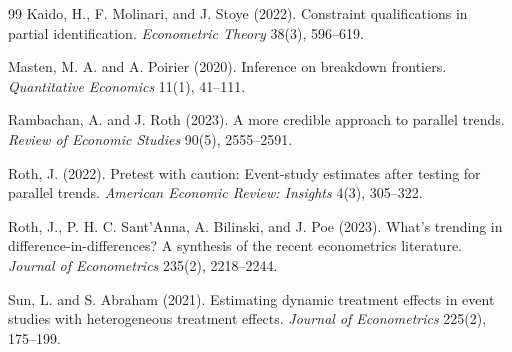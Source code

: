 \documentclass[11pt]{article}
\theoremstyle{definition}
\theoremstyle{plain}
\theoremstyle{remark}
\begin{document}
\begin{thebibliography}{99}
Kaido, H., F. Molinari, and J. Stoye (2022).
\newblock Constraint qualifications in partial identification.
\newblock \emph{Econometric Theory} 38(3), 596--619.

Masten, M. A. and A. Poirier (2020).
\newblock Inference on breakdown frontiers.
\newblock \emph{Quantitative Economics} 11(1), 41--111.

Rambachan, A. and J. Roth (2023).
\newblock A more credible approach to parallel trends.
\newblock \emph{Review of Economic Studies} 90(5), 2555--2591.

Roth, J. (2022).
\newblock Pretest with caution: Event-study estimates after testing for
parallel trends.
\newblock \emph{American Economic Review: Insights} 4(3), 305--322.

Roth, J., P. H. C. Sant'Anna, A. Bilinski, and J. Poe (2023).
\newblock What's trending in difference-in-differences? A synthesis of the
recent econometrics literature.
\newblock \emph{Journal of Econometrics} 235(2), 2218--2244.

Sun, L. and S. Abraham (2021).
\newblock Estimating dynamic treatment effects in event studies with
heterogeneous treatment effects.
\newblock \emph{Journal of Econometrics} 225(2), 175--199.
\end{thebibliography}
\end{document}
